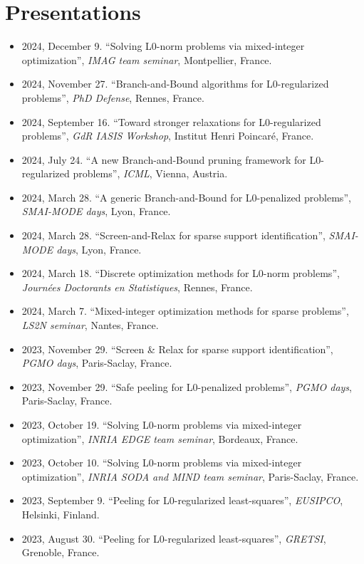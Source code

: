 \section{Presentations}

\begin{itemize}
    \item 2024, December 9. ``Solving L0-norm problems via mixed-integer optimization'', \textit{IMAG team seminar}, Montpellier, France.
    \item 2024, November 27. ``Branch-and-Bound algorithms for L0-regularized problems'', \textit{PhD Defense}, Rennes, France.
    \item 2024, September 16. ``Toward stronger relaxations for L0-regularized problems'', \textit{GdR IASIS Workshop}, Institut Henri Poincaré, France.
    \item 2024, July 24. ``A new Branch-and-Bound pruning framework for L0-regularized problems'', \textit{ICML}, Vienna, Austria.
    \item 2024, March 28. ``A generic Branch-and-Bound for L0-penalized problems'', \textit{SMAI-MODE days}, Lyon, France.
    \item 2024, March 28. ``Screen-and-Relax for sparse support identification'', \textit{SMAI-MODE days}, Lyon, France.
    \item 2024, March 18. ``Discrete optimization methods for L0-norm problems'', \textit{Journées Doctorants en Statistiques}, Rennes, France.
    \item 2024, March 7. ``Mixed-integer optimization methods for sparse problems'', \textit{LS2N seminar}, Nantes, France.
    \item 2023, November 29. ``Screen \& Relax for sparse support identification'', \textit{PGMO days}, Paris-Saclay, France.
    \item 2023, November 29. ``Safe peeling for L0-penalized problems'', \textit{PGMO days}, Paris-Saclay, France.
    \item 2023, October 19. ``Solving L0-norm problems via mixed-integer optimization'', \textit{INRIA EDGE team seminar}, Bordeaux, France.
    \item 2023, October 10. ``Solving L0-norm problems via mixed-integer optimization'', \textit{INRIA SODA and MIND team seminar}, Paris-Saclay, France.
    \item 2023, September 9. ``Peeling for L0-regularized least-squares'', \textit{EUSIPCO}, Helsinki, Finland.
    \item 2023, August 30. ``Peeling for L0-regularized least-squares'', \textit{GRETSI}, Grenoble, France.

\end{itemize}
